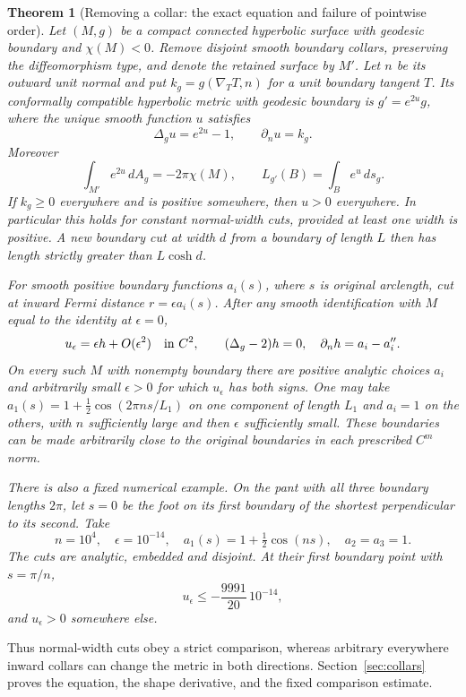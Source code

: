 \documentclass[11pt,a4paper]{article}
\newtheorem{theorem}{Theorem}[section]
\theoremstyle{definition}
\begin{document}
\begin{theorem}[Removing a collar: the exact equation and failure of pointwise order]\label{thm:collar-shape}
Let $(M,g)$ be a compact connected hyperbolic surface with geodesic boundary and $\chi(M)<0$. Remove disjoint smooth boundary collars, preserving the diffeomorphism type, and denote the retained surface by $M'$. Let $n$ be its outward unit normal and put $k_g=g(\nabla_TT,n)$ for a unit boundary tangent $T$. Its conformally compatible hyperbolic metric with geodesic boundary is $g'=e^{2u}g$, where the unique smooth function $u$ satisfies
\[
 \Delta_g u=e^{2u}-1,\qquad \partial_nu=k_g.
\]
Moreover
\[
 \int_{M'}e^{2u}\,dA_g=-2\pi\chi(M),\qquad
 L_{g'}(B)=\int_Be^u\,ds_g.
\]
If $k_g\ge0$ everywhere and is positive somewhere, then $u>0$ everywhere. In particular this holds for constant normal-width cuts, provided at least one width is positive. A new boundary cut at width $d$ from a boundary of length $L$ then has length strictly greater than $L\cosh d$.

For smooth positive boundary functions $a_i(s)$, where $s$ is original arclength, cut at inward Fermi distance $r=\epsilon a_i(s)$. After any smooth identification with $M$ equal to the identity at $\epsilon=0$,
\[
 u_\epsilon=\epsilon h+O(\epsilon^2)\quad\hbox{in }C^2,
 \qquad(\Delta_g-2)h=0,\quad \partial_nh=a_i-a_i''.
\]
On every such $M$ with nonempty boundary there are positive analytic choices $a_i$ and arbitrarily small $\epsilon>0$ for which $u_\epsilon$ has both signs. One may take $a_1(s)=1+\tfrac12\cos(2\pi ns/L_1)$ on one component of length $L_1$ and $a_i=1$ on the others, with $n$ sufficiently large and then $\epsilon$ sufficiently small. These boundaries can be made arbitrarily close to the original boundaries in each prescribed $C^m$ norm.

There is also a fixed numerical example. On the pant with all three boundary lengths $2\pi$, let $s=0$ be the foot on its first boundary of the shortest perpendicular to its second. Take
\[
 n=10^4,\quad \epsilon=10^{-14},\quad
 a_1(s)=1+\tfrac12\cos(ns),\quad a_2=a_3=1.
\]
The cuts are analytic, embedded and disjoint. At their first boundary point with $s=\pi/n$,
\[
                u_\epsilon\le-\frac{9991}{20}\,10^{-14},
\]
and $u_\epsilon>0$ somewhere else.
\end{theorem}

Thus normal-width cuts obey a strict comparison, whereas arbitrary everywhere inward collars can change the metric in both directions. Section~\ref{sec:collars} proves the equation, the shape derivative, and the fixed comparison estimate.
\end{document}
